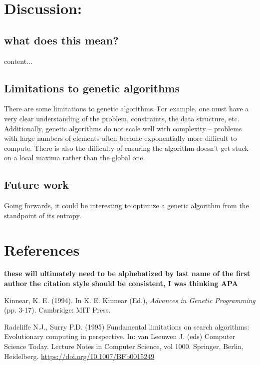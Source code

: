 \documentclass[11pt]{article}
\begin{document}
\begin{figure}
\end{figure}

\section{Discussion:}
\label{sec:org7999995}
\subsection{what does this mean?}
\label{sec:orgf7b36ed}
content...

\subsection{Limitations to genetic algorithms}
\label{sec:org148bf83}
There are some limitations to genetic algorithms. For example, one must
have a very clear understanding of the problem, constraints, the data
structure, etc. Additionally, genetic algorithms do not scale well with
complexity -- problems with large numbers of elements often become exponentially
more difficult to compute. There is also the difficulty of ensuring the
algorithm doesn't get stuck on a local maxima rather than the global one.

\subsection{Future work}
\label{sec:org0f04af1}
Going forwards, it could be interesting to optimize a genetic algorithm from the standpoint of its entropy.

\section{References}
\label{sec:org9dc046e}
\textbf{these will ultimately need to be alphebatized by last name of the first author} \textbf{the citation style should be consistent, I was thinking APA}

Kinnear, K. E. (1994). In K. E. Kinnear (Ed.), \emph{Advances in Genetic Programming} (pp. 3-17). Cambridge: MIT Press.

Radcliffe N.J., Surry P.D. (1995) Fundamental limitations on search algorithms: Evolutionary computing in perspective.
In: van Leeuwen J. (eds) Computer Science Today. Lecture Notes in Computer Science, vol 1000. Springer, Berlin, Heidelberg.
\url{https://doi.org/10.1007/BFb0015249}
\end{document}
